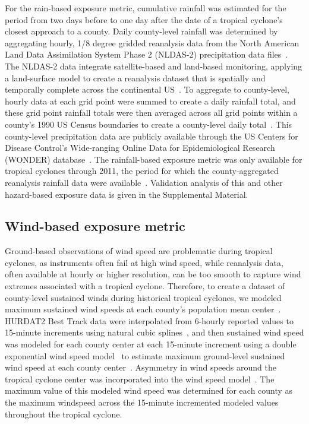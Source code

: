For the rain-based exposure metric, cumulative rainfall was estimated for the
period from two days before to one day after the date of a tropical cyclone's
closest approach to a county. Daily county-level rainfall was determined by
aggregating hourly, 1/8 degree gridded reanalysis data from the North American
Land Data Assimilation System Phase 2 (NLDAS-2) precipitation data 
files~\citep{rui2013nldas}. The NLDAS-2 data integrate satellite-based and land-based
monitoring, applying a land-surface model to create a reanalysis dataset that
is spatially and temporally complete across the continental 
\ac{US}~\citep{rui2013nldas, alhamdan2014environmental}. To aggregate to county-level,
hourly data at each grid point were summed to create a daily rainfall total,
and these grid point rainfall totals were then averaged across all grid points
within a county's 1990 \ac{US} Census boundaries to create a county-level daily
total~\citep{alhamdan2014environmental, cdcwonder}. This county-level
precipitation data are publicly available through the \ac{US} Centers for Disease
Control's Wide-ranging Online Data for Epidemiological Research (WONDER)
database~\citep{cdcwonder, alhamdan2014environmental}. The rainfall-based
exposure metric was only available for tropical cyclones through 2011, the
period for which the county-aggregated reanalysis rainfall data were 
available~\citep{cdcwonder, alhamdan2014environmental}. Validation analysis of this and
other hazard-based exposure data is given in the Supplemental Material.

\subsection*{Wind-based exposure metric}

Ground-based observations of wind speed are problematic during tropical
cyclones, as instruments often fail at high wind speed, while reanalysis data,
often available at hourly or higher resolution, can be too smooth to capture
wind extremes associated with a tropical cyclone. Therefore, to create a
dataset of county-level sustained winds during historical tropical cyclones, we
modeled maximum sustained wind speeds at each county's population mean 
center~\citep{countycenters}. HURDAT2 Best Track data were interpolated from 6-hourly
reported values to 15-minute increments using natural cubic 
splines~\citep{stormwindmodel}, and then sustained wind speed was modeled for each
county center at each 15-minute increment using a double exponential wind speed
model~\citep{willoughby2006parametric} to estimate maximum ground-level
sustained wind speed at each county center~\citep{stormwindmodel}. Asymmetry in
wind speeds around the tropical cyclone center was incorporated into the wind
speed model~\citep{phadke2003modeling, stormwindmodel}. The maximum value of
this modeled wind speed was determined for each county as the maximum windspeed
across the 15-minute incremented modeled values throughout the tropical
cyclone.

